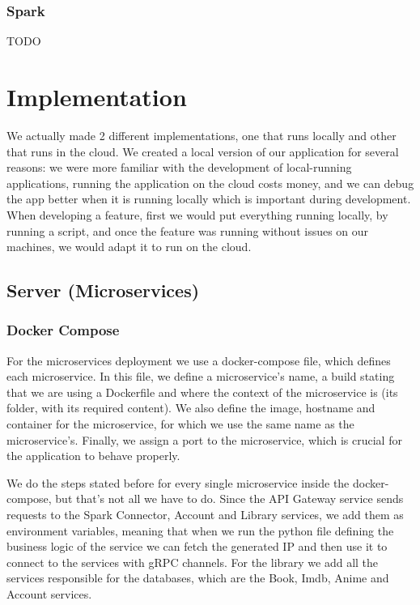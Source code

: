 \documentclass[oneside]{article}
\newcommand*\fpar{\hspace{1ex}}
\begin{document}
    \subsubsection{Spark}
    \fpar TODO

\section{Implementation}
\label{sec:implementation}
\fpar We actually made 2 different implementations, one that runs locally and other that runs in the cloud. We created a local version of our application for several reasons: we were more familiar with the development of local-running applications, running the application on the cloud costs money, and we can debug the app better when it is running locally which is important during development. When developing a feature, first we would put everything running locally, by running a script, and once the feature was running without issues on our machines, we would adapt it to run on the cloud.

  \subsection{Server (Microservices)}
    \subsubsection{Docker Compose}
    \fpar For the microservices deployment we use a docker-compose file, which defines each microservice. In this file, we define a microservice's name, a build stating that we are using a Dockerfile and where the context of the microservice is (its folder, with its required content). We also define the image, hostname and container for the microservice, for which we use the same name as the microservice's. Finally, we assign a port to the microservice, which is crucial for the application to behave properly.
    \par We do the steps stated before for every single microservice inside the docker-compose, but that's not all we have to do. Since the API Gateway service sends requests to the Spark Connector, Account and Library services, we add them as environment variables, meaning that when we run the python file defining the business logic of the service we can fetch the generated IP and then use it to connect to the services with gRPC channels. For the library we add all the services responsible for the databases, which are the Book, Imdb, Anime and Account services.
\end{document}
